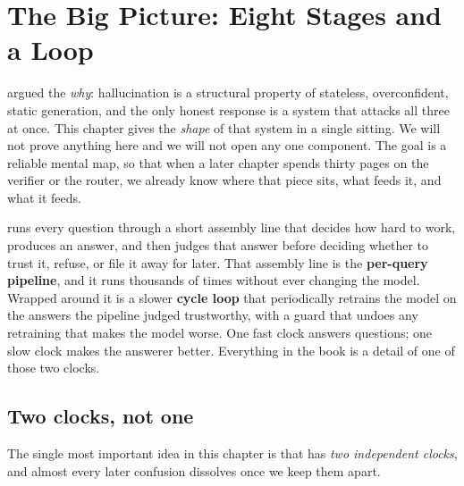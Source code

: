 \chapter{The Big Picture: Eight Stages and a Loop}
\label{ch:bigpicture}

 argued the \emph{why}: hallucination is a structural property
of stateless, overconfident, static generation, and the only honest response is
a system that attacks all three at once. This chapter gives the \emph{shape} of
that system in a single sitting. We will not prove anything here and we will not
open any one component. The goal is a reliable mental map, so that when a later
chapter spends thirty pages on the verifier or the router, we already know where
that piece sits, what feeds it, and what it feeds.

\begin{intuition}
\caem{} runs every question through a short assembly line that decides how hard
to work, produces an answer, and then judges that answer before deciding whether
to trust it, refuse, or file it away for later. That assembly line is the
\textbf{per-query pipeline}, and it runs thousands of times without ever changing
the model. Wrapped around it is a slower \textbf{cycle loop} that periodically
retrains the model on the answers the pipeline judged trustworthy, with a guard
that undoes any retraining that makes the model worse. One fast clock answers
questions; one slow clock makes the answerer better. Everything in the book is a
detail of one of those two clocks.
\end{intuition}

\section{Two clocks, not one}
\label{sec:two-clocks}

The single most important idea in this chapter is that \caem{} has \emph{two
independent clocks}, and almost every later confusion dissolves once we keep them
apart.

